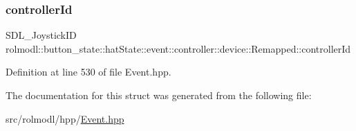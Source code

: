 \subsubsection{\texorpdfstring{controllerId}{controllerId}}
{\footnotesize\ttfamily S\+D\+L\+\_\+\+Joystick\+ID rolmodl\+::button\+\_\+state\+::hat\+State\+::event\+::controller\+::device\+::\+Remapped\+::controller\+Id}



Definition at line 530 of file Event.\+hpp.



The documentation for this struct was generated from the following file\+:\begin{DoxyCompactItemize}
\item 
src/rolmodl/hpp/\mbox{\hyperlink{_event_8hpp}{Event.\+hpp}}\end{DoxyCompactItemize}
